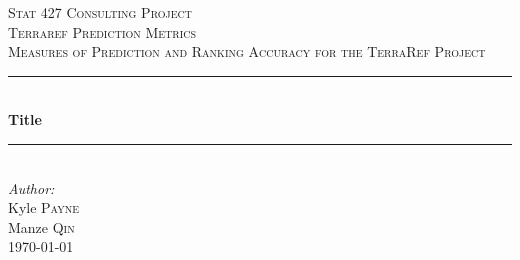 \begin{titlepage}

\newcommand{\HRule}{\rule{\linewidth}{0.5mm}} %

\center %
 

\textsc{\LARGE Stat 427 Consulting Project}\\[1.5cm] %
\textsc{\Large Terraref Prediction Metrics}\\[0.5cm] %
\textsc{\large Measures of Prediction and Ranking Accuracy for the TerraRef Project}\\[0.5cm] %


\HRule \\[0.4cm]
{ \huge \bfseries Title}\\[0.4cm] %
\HRule \\[1.5cm]
 



\Large \emph{Author:}\\
Kyle \textsc{Payne}\\[3cm] %
Manze \textsc{Qin}\\[3cm] 


{\large \today}\\[2cm] %



\end{titlepage}
